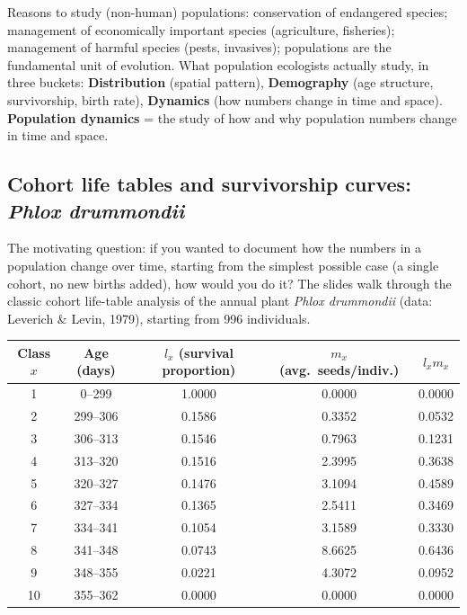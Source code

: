 \documentclass[11pt,a4paper]{article}
\begin{document}
\begin{keybox}
Reasons to study (non-human) populations: conservation of endangered species; management of economically important species (agriculture, fisheries); management of harmful species (pests, invasives); populations are the fundamental unit of evolution. What population ecologists actually study, in three buckets: \textbf{Distribution} (spatial pattern), \textbf{Demography} (age structure, survivorship, birth rate), \textbf{Dynamics} (how numbers change in time and space). \textbf{Population dynamics} = the study of how and why population numbers change in time and space.
\end{keybox}

\subsection{Cohort life tables and survivorship curves: \textit{Phlox drummondii}}
The motivating question: if you wanted to document how the numbers in a population change over time, starting from the simplest possible case (a single cohort, no new births added), how would you do it? The slides walk through the classic cohort life-table analysis of the annual plant \emph{Phlox drummondii} (data: Leverich \& Levin, 1979), starting from 996 individuals.

\begin{center}
\begin{tabular}{@{}ccccc@{}}
\toprule
Class $x$ & Age (days) & $l_x$ (survival proportion) & $m_x$ (avg.\ seeds/indiv.) & $l_x m_x$ \\
\midrule
1 & 0--299 & 1.0000 & 0.0000 & 0.0000 \\
2 & 299--306 & 0.1586 & 0.3352 & 0.0532 \\
3 & 306--313 & 0.1546 & 0.7963 & 0.1231 \\
4 & 313--320 & 0.1516 & 2.3995 & 0.3638 \\
5 & 320--327 & 0.1476 & 3.1094 & 0.4589 \\
6 & 327--334 & 0.1365 & 2.5411 & 0.3469 \\
7 & 334--341 & 0.1054 & 3.1589 & 0.3330 \\
8 & 341--348 & 0.0743 & 8.6625 & 0.6436 \\
9 & 348--355 & 0.0221 & 4.3072 & 0.0952 \\
10 & 355--362 & 0.0000 & 0.0000 & 0.0000 \\
\bottomrule
\end{tabular}
\end{center}
\end{document}
